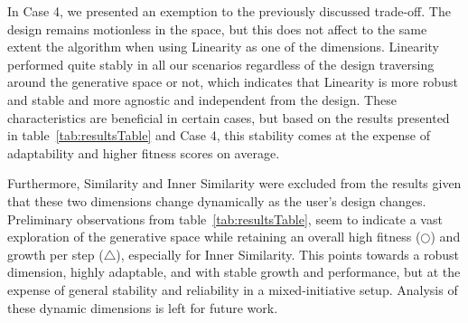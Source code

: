 In Case 4, we presented an exemption to the previously discussed trade-off. The design remains motionless in the space, but this does not affect to the same extent the algorithm when using Linearity as one of the dimensions. Linearity performed quite stably in all our scenarios regardless of the design traversing around the generative space or not, which indicates that Linearity is more robust and stable and more agnostic and independent from the design. These characteristics are beneficial in certain cases, but based on the results presented in table~\ref{tab:resultsTable} and Case 4, this stability comes at the expense of adaptability and higher fitness scores on average.





Furthermore, Similarity and Inner Similarity were excluded from the results given that these two dimensions change dynamically as the user's design changes. Preliminary observations from table~\ref{tab:resultsTable}, seem to indicate a vast exploration of the generative space while retaining an overall high fitness ($\bigcirc$) and growth per step ($\bigtriangleup$), especially for Inner Similarity. This points towards a robust dimension, highly adaptable, and with stable growth and performance, but at the expense of general stability and reliability in a mixed-initiative setup. Analysis of these dynamic dimensions is left for future work.

